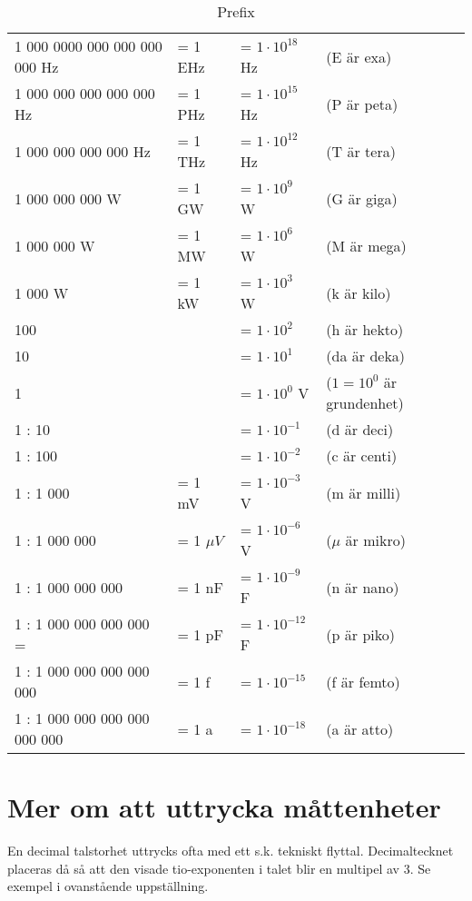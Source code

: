 \begin{table}[h]
  \caption{Prefix}
  \label{tab:prefix}
  \begin{tabular}{|llll|}
    \hline
    1 000 0000 000 000 000 000 Hz & = 1 EHz & = \(1 \cdot 10^{18}\) Hz & (E är exa) \\
    1 000 000 000 000 000 Hz & = 1 PHz & = \(1 \cdot 10^{15}\) Hz & (P är peta) \\
    1 000 000 000 000 Hz & = 1 THz & = \(1 \cdot 10^{12}\) Hz & (T är tera) \\
    1 000 000 000 W & = 1 GW & = \(1 \cdot 10^9\) W & (G är giga) \\
    1 000 000 W & = 1 MW & = \(1 \cdot 10^6\) W & (M är mega) \\
    1 000 W & = 1 kW & = \(1 \cdot 10^3\) W & (k är kilo) \\
    100 & & = \(1 \cdot 10^2\) & (h är hekto) \\
    10 & & = \(1 \cdot 10^1\) & (da är deka) \\
    1 & & = \(1 \cdot 10^0\) V & (\(1 = 10^0\) är grundenhet) \\
    1 : 10 & & = \(1 \cdot 10^{-1}\) & (d är deci) \\
    1 : 100 & & = \(1 \cdot 10^{-2}\) & (c är centi) \\
    1 : 1 000 & = 1 mV & = \(1 \cdot 10^{-3}\) V & (m är milli) \\
    1 : 1 000 000 & = 1 \(\mu V\) & = \(1 \cdot 10^{-6}\) V & (\(\mu \) är mikro) \\
    1 : 1 000 000 000 & = 1 nF & = \(1 \cdot 10^{-9}\) F & (n är nano) \\
    1 : 1 000 000 000 000 = & = 1 pF & = \(1 \cdot 10^{-12}\) F & (p är piko) \\
    1 : 1 000 000 000 000 000 & = 1 f & = \(1 \cdot 10^{-15}\) & (f är femto) \\
    1 : 1 000 000 000 000 000 000 & = 1 a & = \(1 \cdot 10^{-18}\) & (a är atto) \\
    \hline
  \end{tabular}
\end{table}


\section{Mer om att uttrycka måttenheter}

En decimal talstorhet uttrycks ofta med ett s.k. tekniskt flyttal.
Decimaltecknet placeras då så att den visade tio-exponenten i talet
blir en multipel av 3. Se exempel i ovanstående uppställning.

